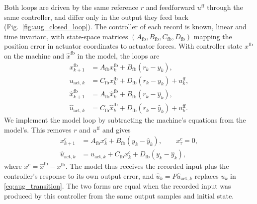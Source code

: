 Both loops are driven by the same reference $r$ and feedforward
$u^{\mathrm{ff}}$ through the same controller, and differ only in the output
they feed back (Fig.~\ref{fig:aug_closed_loop}).
The controller of each record is known, linear and time invariant, with
state-space matrices $(A_{\mathrm{fb}},B_{\mathrm{fb}},C_{\mathrm{fb}},D_{\mathrm{fb}})$
mapping the position error in actuator coordinates to actuator forces.
With controller state $x^{\mathrm{fb}}$ on the machine and
$\hat x^{\mathrm{fb}}$ in the model, the loops are
\begin{equation}
\begin{aligned}
 x^{\mathrm{fb}}_{k+1}&=A_{\mathrm{fb}}x^{\mathrm{fb}}_k+B_{\mathrm{fb}}(r_k-y_k),\\
 u_{\mathrm{act},k}&=C_{\mathrm{fb}}x^{\mathrm{fb}}_k+D_{\mathrm{fb}}(r_k-y_k)+u^{\mathrm{ff}}_k,\\
 \hat x^{\mathrm{fb}}_{k+1}&=A_{\mathrm{fb}}\hat x^{\mathrm{fb}}_k+B_{\mathrm{fb}}(r_k-\hat y_k),\\
 \hat u_{\mathrm{act},k}&=C_{\mathrm{fb}}\hat x^{\mathrm{fb}}_k+D_{\mathrm{fb}}(r_k-\hat y_k)+u^{\mathrm{ff}}_k.
\end{aligned}
\label{eq:aug_direct_loop}
\end{equation}
We implement the model loop by subtracting the machine's equations from the
model's.
This removes $r$ and $u^{\mathrm{ff}}$ and gives
\begin{equation}
\begin{aligned}
 x^{c}_{k+1}&=A_{\mathrm{fb}}x^{c}_k+B_{\mathrm{fb}}(y_k-\hat y_k),\qquad x^{c}_\tau=0,\\
 \hat u_{\mathrm{act},k}&=u_{\mathrm{act},k}+C_{\mathrm{fb}}x^{c}_k+D_{\mathrm{fb}}(y_k-\hat y_k),
\end{aligned}
\label{eq:aug_residual_loop}
\end{equation}
where $x^{c}=\hat x^{\mathrm{fb}}-x^{\mathrm{fb}}$.
The model thus receives the recorded input plus the controller's response to
its own output error, and $\hat u_k=P\hat u_{\mathrm{act},k}$ replaces $u_k$
in \eqref{eq:aug_transition}.
The two forms are equal when the recorded input was produced by this
controller from the same output samples and initial state.

